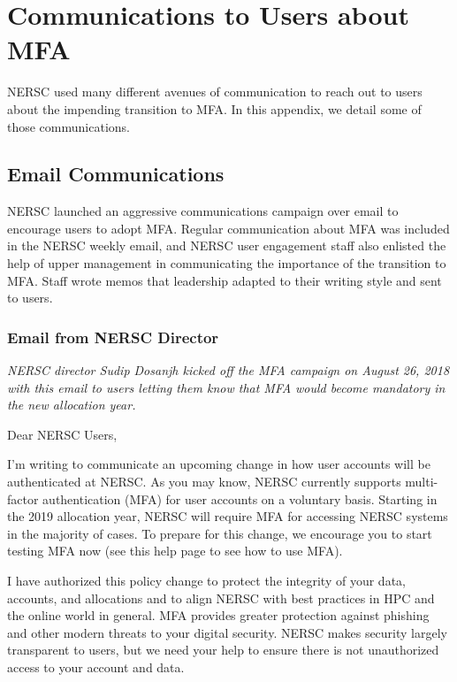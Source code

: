 \documentclass[sigconf,review]{acmart}
\begin{document}



\appendix

\section{Communications to Users about MFA}
\label{comms}
NERSC used many different avenues of communication to reach out to users about
the impending transition to MFA. In this appendix, we detail some of those
communications.

\subsection{Email Communications}
\label{email}

NERSC launched an aggressive communications campaign over email to encourage
users to adopt MFA. Regular communication about MFA was included in the NERSC
weekly email, and NERSC user engagement staff also enlisted the help of upper
management in communicating the importance of the transition to MFA. Staff
wrote memos that leadership adapted to their writing style and sent to users.

\subsubsection{Email from NERSC Director}
{\em NERSC director Sudip Dosanjh kicked off the MFA campaign on
August 26, 2018 with this email to users letting them know
that MFA would become mandatory in the new allocation year.}

Dear NERSC Users, 

I’m writing to communicate an upcoming change in how user accounts will be authenticated at NERSC. As you may know, NERSC currently supports multi-factor authentication (MFA) for user accounts on a voluntary basis. Starting in the 2019 allocation year, NERSC will require MFA for accessing NERSC systems in the majority of cases.  To prepare for this change, we encourage you to start testing MFA now (see this help page to see how to use MFA).

I have authorized this policy change to protect the integrity of your data, accounts, and allocations and to align NERSC with best practices in HPC and the online world in general.  MFA provides greater protection against phishing and other modern threats to your digital security.  NERSC makes security largely transparent to users, but we need your help to ensure there is not unauthorized access to your account and data.
\end{document}
